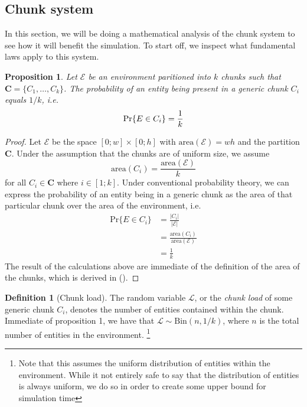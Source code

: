 \documentclass[a4paper, 12pt]{report}
\newtheorem{proposition}{Proposition}
\theoremstyle{definition}
\newtheorem{definition}{Definition}
\begin{document}
\subsection{Chunk system}
In this section, we will be doing a mathematical analysis of the chunk system to see how it will benefit the simulation. To start off, we inspect what fundamental laws apply to this system.

\begin{proposition}
    Let $\mathscr E$ be an environment paritioned into $k$ chunks such that $\mathbf C = \{C_1, \ldots, C_k\}$. The probability of an entity being present in a generic chunk $C_i$ equals $1/k$, i.e.
    \[
        \textnormal{Pr}\{E \in C_i\} = \frac 1k
    \]
\end{proposition}

\begin{proof}
    Let $\mathscr E$ be the space $[0; w] \times [0;h]$ with $\text{area}(\mathscr E) = wh$ and the partition $\mathbf C$. Under the assumption that the chunks
    are of uniform size, we assume
    \[
        \text{area}(C_i) = \frac{\text{area}(\mathscr E)}{k} \tag{\textasteriskcentered}
    \]
    for all $C_i \in \mathbf C$ where $i \in [1; k]$. Under conventional probability theory, we can express the probability of an entity being in a generic chunk as
    the area of that particular chunk over the area of the environment, i.e.
    \begin{align*}
        \text{Pr}\{E \in C_i\} &= \frac{|C_i|}{|\mathscr E|} \\
                               &= \frac{\text{area}(C_i)}{\text{area}(\mathscr E)} \\
                               &= \frac{1}{k}
    \end{align*}
    The result of the calculations above are immediate of the definition of the area of the chunks, which is derived in (\textasteriskcentered).
\end{proof}

\begin{definition}[Chunk load]
    The random variable $\mathcal L$, or the \emph{chunk load} of some generic chunk $C_i$,
    denotes the number of entities contained within the chunk. Immediate of proposition 1,
    we have that $\mathcal L \sim \text{Bin}(n, 1/k)$, where $n$ is the total number of entities
    in the environment. \footnote{Note that this assumes the uniform distribution of entities within
    the environment. While it not entirely safe to say that the distribution of entities is always uniform, we do so in order to create some upper bound for simulation time}
\end{definition}
\end{document}
